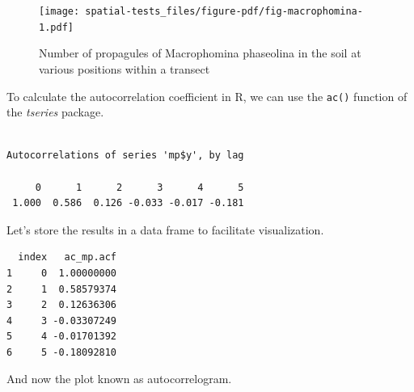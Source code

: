 \documentclass[
  letterpaper,
]{book}
\newenvironment{Shaded}{\begin{snugshade}}{\end{snugshade}}
\newcommand{\AttributeTok}[1]{\textcolor[rgb]{0.40,0.45,0.13}{#1}}
\newcommand{\ConstantTok}[1]{\textcolor[rgb]{0.56,0.35,0.01}{#1}}
\newcommand{\DecValTok}[1]{\textcolor[rgb]{0.68,0.00,0.00}{#1}}
\newcommand{\FunctionTok}[1]{\textcolor[rgb]{0.28,0.35,0.67}{#1}}
\newcommand{\NormalTok}[1]{\textcolor[rgb]{0.00,0.23,0.31}{#1}}
\newcommand{\OtherTok}[1]{\textcolor[rgb]{0.00,0.23,0.31}{#1}}
\newcommand{\SpecialCharTok}[1]{\textcolor[rgb]{0.37,0.37,0.37}{#1}}
\begin{document}
\begin{figure}[H]

{\centering \texttt{[image: spatial-tests\_files/figure-pdf/fig-macrophomina-1.pdf]}

}

\caption{\label{fig-macrophomina}Number of propagules of Macrophomina
phaseolina in the soil at various positions within a transect}

\end{figure}

To calculate the autocorrelation coefficient in R, we can use the
\texttt{ac()} function of the \emph{tseries} package.

\begin{Shaded}
\end{Shaded}

\begin{verbatim}

Autocorrelations of series 'mp$y', by lag

     0      1      2      3      4      5 
 1.000  0.586  0.126 -0.033 -0.017 -0.181 
\end{verbatim}

Let's store the results in a data frame to facilitate visualization.

\begin{Shaded}
\end{Shaded}

\begin{verbatim}
  index   ac_mp.acf
1     0  1.00000000
2     1  0.58579374
3     2  0.12636306
4     3 -0.03307249
5     4 -0.01701392
6     5 -0.18092810
\end{verbatim}

And now the plot known as autocorrelogram.
\end{document}
